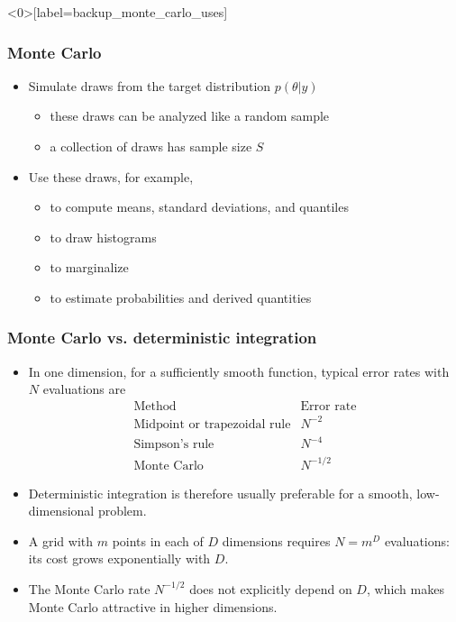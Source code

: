 \documentclass[10pt]{beamer}
\begin{document}
\begin{frame}<0>[label=backup_monte_carlo_uses]

\frametitle{Monte Carlo}

  \begin{itemize}
  \item Simulate draws from the target distribution $p(\theta|y)$
    \begin{itemize}
    \item these draws can be analyzed like a random sample
    \item a collection of draws has sample size $S$
    \end{itemize}
    \pause
  \item Use these draws, for example,
    \begin{itemize}
    \item to compute means, standard deviations, and quantiles
    \item to draw histograms
    \item to marginalize
    \item to estimate probabilities and derived quantities
    \end{itemize}
  \end{itemize}

\end{frame}

\begin{frame}


\frametitle{Monte Carlo vs. deterministic integration}

  \begin{itemize}
  \item In one dimension, for a sufficiently smooth function, typical
    error rates with $N$ evaluations are
    \[
      \begin{array}{c|c}
        \text{Method} & \text{Error rate} \\
        \hline
        \text{Midpoint or trapezoidal rule} & N^{-2} \\
        \text{Simpson's rule} & N^{-4} \\
        \text{Monte Carlo} & N^{-1/2}
      \end{array}
    \]
  \item Deterministic integration is therefore usually preferable for
    a smooth, low-dimensional problem.
  \pause
  \item A grid with $m$ points in each of $D$ dimensions requires
    $N=m^D$ evaluations: its cost grows exponentially with $D$.
  \item<3-> The Monte Carlo rate $N^{-1/2}$ does not explicitly depend on
    $D$, which makes Monte Carlo attractive in higher dimensions.
  \end{itemize}

\end{frame}
\end{document}
